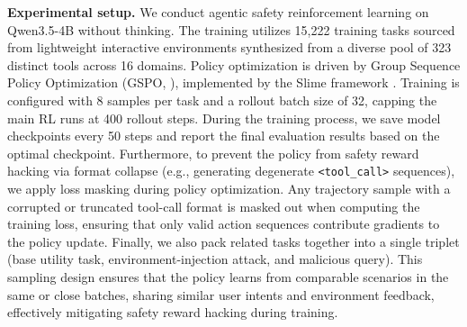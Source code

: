 \textbf{Experimental setup.} We conduct agentic safety reinforcement learning on Qwen3.5-4B without thinking. The training utilizes 15,222 training tasks sourced from lightweight interactive environments synthesized from a diverse pool of 323 distinct tools across 16 domains. Policy optimization is driven by Group Sequence Policy Optimization (GSPO, \citep{zheng2025group}), implemented by the Slime framework \citep{slime}. Training is configured with 8 samples per task and a rollout batch size of 32, capping the main RL runs at 400 rollout steps. During the training process, we save model checkpoints every 50 steps and report the final evaluation results based on the optimal checkpoint. Furthermore, to prevent the policy from safety reward hacking via format collapse (e.g., generating degenerate \texttt{<tool\_call>} sequences), we apply loss masking during policy optimization. Any trajectory sample with a corrupted or truncated tool-call format is masked out when computing the training loss, ensuring that only valid action sequences contribute gradients to the policy update. Finally, we also pack related tasks together into a single triplet (base utility task, environment-injection attack, and malicious query). This sampling design ensures that the policy learns from comparable scenarios in the same or close batches, sharing similar user intents and environment feedback, effectively mitigating safety reward hacking during training.

